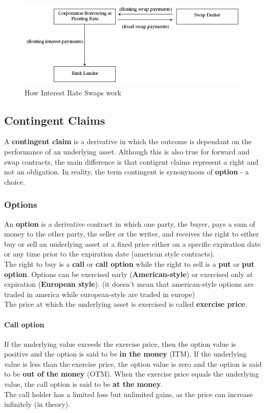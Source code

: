 \documentclass[fleqn,10pt]{SelfArx} %
\begin{document}
\begin{figure}[H]
	\centering
	\includegraphics[width=\linewidth]{2}
	\caption{How Interest Rate Swaps work}
	\label{fig:results}
\end{figure}

\subsection{Contingent Claims}

A \textbf{contingent claim} is a derivative in which the outcome is dependant on the performance of an underlying asset. Although this is also true for forward and swap contracts, the main difference is that contigent claims represent a right and not an obligation. In reality, the term contingent is synonymous of \textbf{option} - a choice.

\subsubsection{Options}

An \textbf{option} is a derivative contract in which one party, the buyer, pays a sum of money to the other party, the seller or the writer, and receives the right to either buy or sell an underlying asset at a fixed price either on a specific expiration date or any time prior to the expiration date (american style contracts).
\\
The right to buy is a \textbf{call} or \textbf{call option} while the right to sell is a \textbf{put} or \textbf{put option}. Options can be exercised early (\textbf{American-style}) or exercised only at expiration (\textbf{European style}). (it doesn't mean that american-style options are traded in america while european-style are traded in europe)
\\
The price at which the underlying asset is exercised is called \textbf{exercise price}.

\paragraph{Call option} If the underlying value exceeds the exercise price, then the option value is positive and the option is said to be \textbf{in the money} (ITM). If the underlying value is less than the exercise price, the option value is zero and the option is said to be \textbf{out of the money} (OTM). When the exercise price equals the underlying value, the call option is said to be \textbf{at the money}.
\\
The call holder has a limited loss but unlimited gains, as the price can increase infinitely (in theory).
\end{document}
